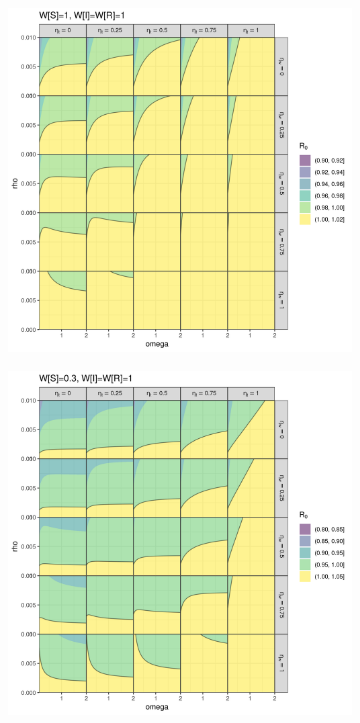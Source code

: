 \documentclass{article}\usepackage[]{graphicx}\usepackage[]{color}
\begin{document}
\newpage
\begin{figure}
\centering
\begin{subfigure}[t]{.45\textwidth}
\centering
\includegraphics[width=\linewidth]{../pix/R0contour_random.png}
        \caption{}\label{fig:fig_a}
\end{subfigure}
%
\begin{subfigure}[t]{.45\textwidth}
\centering
\includegraphics[width=\linewidth]{../pix/R0contour_TTI.png}
\caption{}\label{fig:fig_b}
\end{subfigure}
\end{figure}
\end{document}
